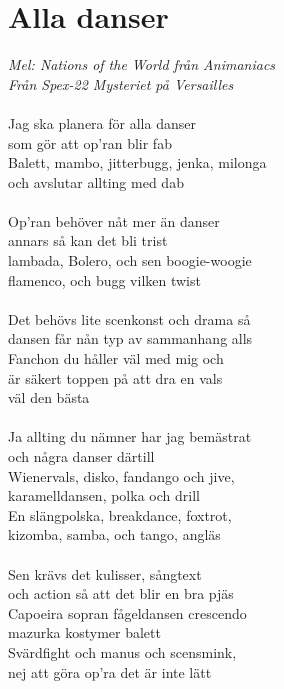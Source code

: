 \documentclass[a5paper,15pt]{article}
\begin{document}
\section{Alla danser}
\emph{Mel: Nations of the World från Animaniacs \\
Från Spex-22 Mysteriet på Versailles} \\
\\
Jag ska planera för alla danser \\
som gör att op’ran blir fab\\
Balett, mambo, jitterbugg, jenka, milonga\\
och avslutar allting med dab\\
\\
Op’ran behöver nåt mer än danser \\
annars så kan det bli trist\\
lambada, Bolero, och sen boogie-woogie\\
flamenco, och bugg vilken twist\\
\\
Det behövs lite scenkonst och drama så\\
dansen får nån typ av sammanhang alls\\
Fanchon du håller väl med mig och\\
är säkert toppen på att dra en vals\\
väl den bästa\\
\\
Ja allting du nämner har jag bemästrat \\
och några danser därtill\\
Wienervals, disko, fandango och jive,\\
karamelldansen, polka och drill\\
En slängpolska, breakdance, foxtrot,\\
kizomba, samba, och tango, angläs\\
\\
Sen krävs det kulisser, sångtext\\
och action
så att det blir en bra pjäs\\
Capoeira sopran fågeldansen crescendo\\
mazurka kostymer balett\\
Svärdfight och manus och scensmink, \\
nej att göra op’ra det är inte lätt
\\
\end{document}
